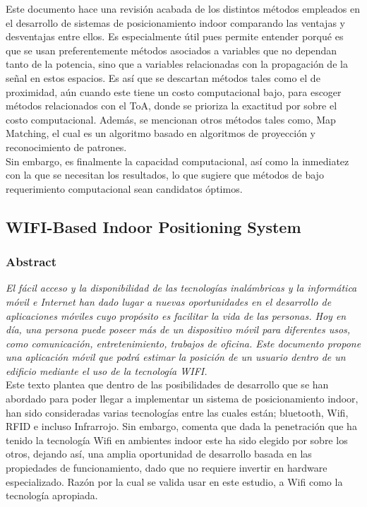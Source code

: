 Este documento hace una revisión acabada de los distintos métodos empleados en el desarrollo de sistemas de posicionamiento indoor comparando las ventajas y desventajas entre ellos. Es especialmente útil pues permite entender porqué es que se usan preferentemente métodos asociados a variables que no dependan tanto de la potencia, sino que a variables relacionadas con la propagación de la señal en estos espacios. Es así que se descartan métodos tales  como el de proximidad, aún cuando este tiene un costo computacional bajo, para escoger métodos  relacionados con el ToA, donde se prioriza la exactitud por sobre el costo computacional. Además, se mencionan otros métodos tales como, Map Matching, el cual es un algoritmo basado en algoritmos de proyección y reconocimiento de patrones.\\

Sin embargo, es finalmente la capacidad computacional, así como la inmediatez con la que se necesitan los resultados, lo que sugiere que métodos de bajo requerimiento computacional sean candidatos óptimos.

\subsection{WIFI-Based Indoor Positioning System}
\subsubsection{Abstract}

\emph{El fácil acceso y la disponibilidad de las tecnologías inalámbricas y la informática móvil e Internet han dado lugar a nuevas oportunidades en el desarrollo de aplicaciones móviles cuyo propósito es facilitar la vida de las personas. Hoy en día, una persona puede poseer más de un dispositivo móvil para diferentes usos, como comunicación, entretenimiento, trabajos de oficina. Este documento propone una aplicación móvil que podrá estimar la posición de un usuario dentro de un edificio mediante el uso de la tecnología WIFI.}\\

Este texto plantea que dentro de las posibilidades de desarrollo que se han abordado para poder llegar a implementar un sistema de posicionamiento indoor, han sido consideradas varias tecnologías entre las cuales están; bluetooth, Wifi, RFID e incluso Infrarrojo. Sin embargo, comenta que dada la penetración que ha tenido la tecnología Wifi en ambientes indoor este ha sido elegido por sobre los otros, dejando así, una amplia oportunidad de desarrollo basada en las propiedades de funcionamiento, dado que no requiere invertir en hardware especializado. Razón por la cual se valida usar en este estudio, a Wifi como la tecnología apropiada.\\

